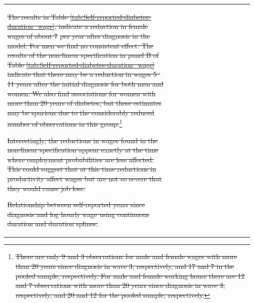 \documentclass[12pt,english]{article}
\providecommand{\DIFdeltex}[1]{{\protect\color{red}\sout{#1}}}                      %
\providecommand{\DIFdelFL}[1]{\DIFdel{#1}} %
\providecommand{\DIFdel}[1]{\texorpdfstring{\DIFdeltex{#1}}{}} %
\begin{document}
\begin{table}[!ht]
\begin{center}
\begin{adjustbox}{max width=0.8\linewidth}
\begin{threeparttable}
{\begin{tabular}{l*{6}{S
S}}
\DIFdelFL{The results in Table \ref{tab:Self-reported-diabetes-duration_wage}, indicate a reduction in female wages of about 7}%
\DIFdelFL{per year after diagnosis in the }%
\DIFdelFL{model. For men we find no consistent effect. The results of the non-linear specification in panel B of Table \ref{tab:Self-reported-diabetes-duration_wage} indicate that there may be a reduction in wages 5--11 years after the initial diagnosis for both men and women. We also find associations for women with more than 20 years of diabetes, but these estimates may be spurious due to the considerably reduced number of observations in this group.}\footnote{\DIFdelFL{There are only 9 and 3 observations for male and female wages with more than 20 years since diagnosis in wave 3, respectively, and 17 and 7 in the pooled sample, respectively. For male and female working hours there are 12 and 7 observations with more than 20 years since diagnosis in wave 3, respectively, and 20 and 12 for the pooled sample, respectively.}} %
\addtocounter{footnote}{-1}%
\DIFdelFL{Interestingly, the reductions in wages found in the non-linear specification appear exactly at the time where employment probabilities are less affected. This could suggest that at this time reductions in productivity affect wages but are not so severe that they would cause job loss. 
}%

{%
\DIFdelFL{Relationship between self-reported years since diagnosis and log hourly wage using continuous duration and duration splines.}}


\end{tabular}}
\end{threeparttable}
\end{adjustbox}
\end{center}
\end{table}
\end{document}
